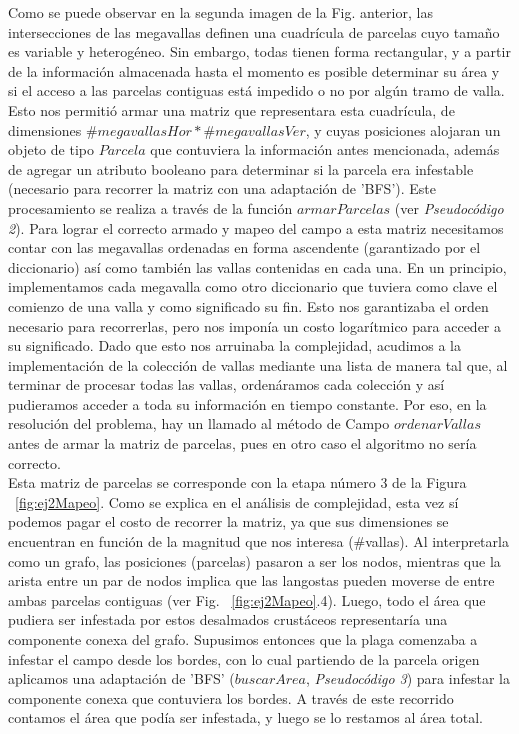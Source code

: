 Como se puede observar en la segunda imagen de la Fig. anterior, las intersecciones de las megavallas definen una cuadrícula de parcelas cuyo tamaño es variable y heterogéneo. Sin embargo, todas tienen forma rectangular, y a partir de la información almacenada hasta el momento es posible determinar su área y si el acceso a las parcelas contiguas está impedido o no por algún tramo de valla. Esto nos permitió armar una matriz que representara esta cuadrícula, de dimensiones $\#megavallasHor*\#megavallasVer$, y cuyas posiciones alojaran un objeto de tipo $Parcela$ que contuviera la información antes mencionada, además de agregar un atributo booleano para determinar si la parcela era infestable (necesario para recorrer la matriz con una adaptación de 'BFS'). Este procesamiento se realiza a través de la función $armarParcelas$ (ver \textsl{Pseudocódigo 2}). Para lograr el correcto armado y mapeo del campo a esta matriz necesitamos contar con las megavallas ordenadas en forma ascendente (garantizado por el diccionario) así como también las vallas contenidas en cada una. En un principio, implementamos cada megavalla como otro diccionario que tuviera como clave el comienzo de una valla y como significado su fin. Esto nos garantizaba el orden necesario para recorrerlas, pero nos imponía un costo logarítmico para acceder a su significado. Dado que esto nos arruinaba la complejidad, acudimos a la implementación de la colección de vallas mediante una lista de manera tal que, al terminar de procesar todas las vallas, ordenáramos cada colección y así pudieramos acceder a toda su información en tiempo constante. Por eso, en la resolución del problema, hay un llamado al método de Campo $ordenarVallas$ antes de armar la matriz de parcelas, pues en otro caso el algoritmo no sería correcto.\\
\indent Esta matriz de parcelas se corresponde con la etapa número 3 de la Figura ~\ref{fig:ej2Mapeo}. Como se explica en el análisis de complejidad, esta vez sí podemos pagar el costo de recorrer la matriz, ya que sus dimensiones se encuentran en función de la magnitud que nos interesa (\#vallas). Al interpretarla como un grafo, las posiciones (parcelas) pasaron a ser los nodos, mientras que la arista entre un par de nodos implica que las langostas pueden moverse de entre ambas parcelas contiguas (ver Fig. ~\ref{fig:ej2Mapeo}.4). Luego, todo el área que pudiera ser infestada por estos desalmados crustáceos representaría una componente conexa del grafo. Supusimos entonces que la plaga comenzaba a infestar el campo desde los bordes, con lo cual partiendo de la parcela origen aplicamos una adaptación de 'BFS' ($buscarArea$, \textsl{Pseudocódigo 3}) para infestar la componente conexa que contuviera los bordes. A través de este recorrido contamos el área que podía ser infestada, y luego se lo restamos al área total.


